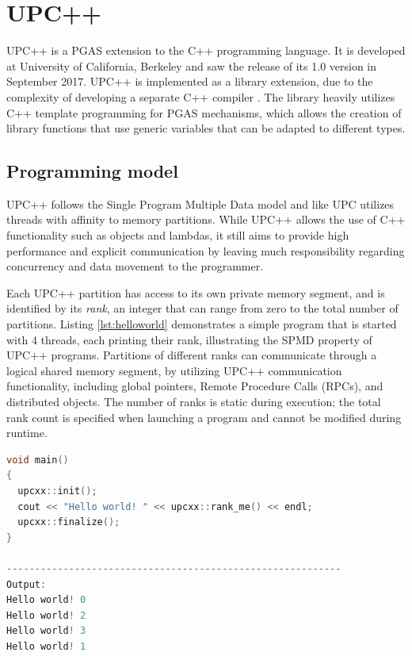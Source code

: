 \documentclass{uit-report}
\begin{document}
\section{UPC++}
UPC++ is a PGAS extension to the C++ programming language. It is developed at University of California, Berkeley and saw the release of its 1.0 version in September 2017. UPC++ is implemented as a library extension, due to the complexity of developing a separate C++ compiler \cite{zheng_kamil_driscoll_shan_yelick_2014}. The library heavily utilizes C++ template programming \cite{web_cpp_template} for PGAS mechanisms, which allows the creation of library functions that use generic variables that can be adapted to different types. 

\subsection{Programming model}
UPC++ follows the Single Program Multiple Data model and like UPC utilizes threads with affinity to memory partitions. While UPC++ allows the use of C++ functionality such as objects and lambdas, it still aims to provide high performance and explicit communication by leaving much responsibility regarding concurrency and data movement to the programmer.

Each UPC++ partition has access to its own private memory segment, and is identified by its \emph{rank}, an integer that can range from zero to the total number of partitions. Listing \ref{lst:helloworld} demonstrates a simple program that is started with 4 threads, each printing their rank, illustrating the SPMD property of UPC++ programs. Partitions of different ranks can communicate through a logical shared memory segment, by utilizing UPC++ communication functionality, including global pointers, Remote Procedure Calls (RPCs), and distributed objects. The number of ranks is static during execution; the total rank count is specified when launching a program and cannot be modified during runtime.


\begin{lstlisting}[label={lst:helloworld}, float, caption="Hello World"-program in UPC++ and its output, frame=tlrb, captionpos=b, language=c++, showstringspaces=false]
void main()
{
  upcxx::init();
  cout << "Hello world! " << upcxx::rank_me() << endl;
  upcxx::finalize();
}

-----------------------------------------------------------
Output:
Hello world! 0
Hello world! 2
Hello world! 3
Hello world! 1
\end{lstlisting}
\end{document}
